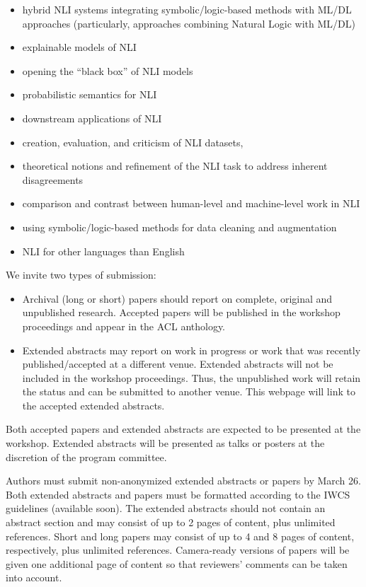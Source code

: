 \documentclass{article}
\begin{document}
\begin{itemize}
\begin{itemize}\item  hybrid NLI systems integrating symbolic/logic-based methods with ML/DL approaches (particularly, approaches combining Natural Logic with ML/DL)
\item  explainable models of NLI
\item  opening the ``black box'' of NLI models
\item  probabilistic semantics for NLI
\item  downstream applications of NLI
\item  creation, evaluation, and criticism of NLI datasets,
\item  theoretical notions and refinement of the NLI task to address inherent disagreements
\item  comparison and contrast between human-level and machine-level work in NLI
\item  using symbolic/logic-based methods for data cleaning and augmentation
\item  NLI for other languages than English
\end{itemize} 
  We invite two types of submission: 
 
\begin{itemize}\item  Archival (long or short) papers should report on complete, original and unpublished research. Accepted papers will be published in the workshop proceedings and appear in the ACL anthology. 
\item  Extended abstracts may report on work in progress or work that was recently published/accepted at a different venue. Extended abstracts will not be included in the workshop proceedings. Thus, the unpublished work will retain the status and can be submitted to another venue. This webpage will link to the accepted extended abstracts.
\end{itemize} 
  Both accepted papers and extended abstracts are expected to be presented at the workshop. Extended abstracts will be presented as talks or posters at the discretion of the program committee. 
 
  Authors must submit non-anonymized extended abstracts or papers by March 26. Both extended abstracts and papers must be formatted according to the IWCS guidelines (available soon). The extended abstracts should not contain an abstract section and may consist of up to 2 pages of content, plus unlimited references. Short and long papers may consist of up to 4 and 8 pages of content, respectively, plus unlimited references. Camera-ready versions of papers will be given one additional page of content so that reviewers’ comments can be taken into account. 
 

\end{itemize}
\end{document}
